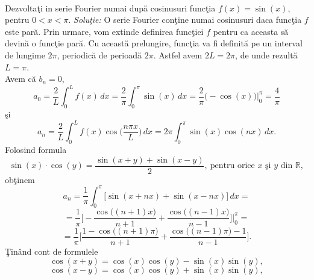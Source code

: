 \documentclass[a4paper,openany,12pt]{report}
\begin{document}
\paragraph*{}Dezvolta\c ti in serie Fourier numai dup\u a cosinusuri func\c tia $f(x)=\sin(x)$, pentru $0<x<\pi$.
\newline
\newline
\newline
\textit{Solu\c tie:}
\newline
O serie Fourier con\c tine numai cosinusuri daca func\c tia $f$ este par\u a. Prin urmare, vom extinde definirea func\c tiei $f$ pentru ca aceasta s\u a devin\u a o func\c tie par\u a. Cu aceast\u a prelungire, func\c tia va fi definit\u a pe un interval de lungime $2\pi$, periodic\u a de perioad\u a $2\pi$. Astfel avem $2L=2\pi$, de unde rezult\u a $L=\pi.$\\
\newline
Avem c\u a $b_n=0$, 
\begin{equation*}
a_0=\frac{2}{L}\int_0^L f(x)\, dx = \frac{2}{\pi} \int_0^{\pi}\sin (x)\, dx = \frac{2}{\pi}\big(-\cos(x)\big) \bigg|_0^\pi = \frac{4}{\pi}
\end{equation*}
\c si 
\begin{equation*}
a_n=\frac{2}{L}\int_0^L f(x) \cos\bigg(\frac{n\pi x}{L}\bigg)\, dx={2}{\pi}\int_0^{\pi}\sin(x)\cos(nx)\, dx.
\end{equation*}
Folosind formula
\begin{equation*}
\sin(x) \cdot \cos(y) = \frac{\sin(x+y)+\sin(x-y)}{2},\: \text{pentru orice $x$ \c si $y$ din } \mathbb{R},
\end{equation*}
ob\c tinem
\begin{equation*}
a_n=\frac{1}{\pi} \int_0^{\pi}\Big[\sin(x+nx)+\sin(x-nx)\Big]\, dx =
\end{equation*}
\begin{equation*}
= \frac{1}{\pi}\Bigg[-\frac{\cos\big((n+1)x\big)}{n+1}+\frac{\cos\big((n-1)x\big)}{n-1}\Bigg]\Bigg|_0^{\pi}=
\end{equation*}
\begin{equation*}
=\frac{1}{\pi}\Bigg[\frac{1- \cos\big((n+1)\pi\big)}{n+1}+\frac{\cos\big((n-1)\pi \big)-1}{n-1}\Bigg].
\end{equation*}
\c Tin\^ and cont de formulele
\begin{equation*}
\cos(x+y)=\cos(x)\cos(y)-\sin(x)\sin(y),
\end{equation*}
\begin{equation*}
\cos(x-y)=\cos(x)\cos(y)+\sin(x)\sin(y),
\end{equation*}
\end{document}
